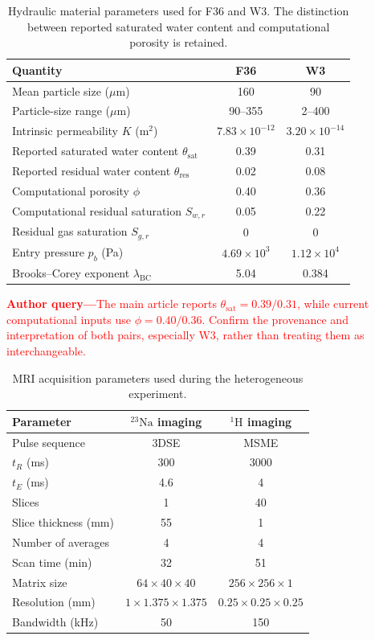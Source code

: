 \documentclass[draft,wrr]{agutexSI2019}
\newcommand{\NaIso}{\(^{23}\mathrm{Na}\)}
\newcommand{\HIso}{\(^{1}\mathrm{H}\)}
\begin{document}
\begin{table}
\caption{Hydraulic material parameters used for F36 and W3. The distinction
between reported saturated water content and computational porosity is retained.}
\label{tab:si-materials}
\centering
\begin{tabular}{p{}cc}
\toprule
Quantity & F36 & W3 \\
\midrule
Mean particle size ($\mu$m) & 160 & 90 \\
Particle-size range ($\mu$m) & 90--355 & 2--400 \\
Intrinsic permeability $K$ (m$^2$) & $7.83\times10^{-12}$ & $3.20\times10^{-14}$ \\
Reported saturated water content $\theta_{\mathrm{sat}}$ & 0.39 & 0.31 \\
Reported residual water content $\theta_{\mathrm{res}}$ & 0.02 & 0.08 \\
Computational porosity $\phi$ & 0.40 & 0.36 \\
Computational residual saturation $S_{w,r}$ & 0.05 & 0.22 \\
Residual gas saturation $S_{g,r}$ & 0 & 0 \\
Entry pressure $p_b$ (Pa) & $4.69\times10^3$ & $1.12\times10^4$ \\
Brooks--Corey exponent $\lambda_{\mathrm{BC}}$ & 5.04 & 0.384 \\
\bottomrule
\end{tabular}

\vspace{1ex}
\noindent\textcolor{red}{\textbf{Author query---}The main article reports
$\theta_{\mathrm{sat}}=0.39/0.31$, while current computational inputs use
$\phi=0.40/0.36$. Confirm the provenance and interpretation of both pairs,
especially W3, rather than treating them as interchangeable.}
\end{table}

\begin{table}
\caption{MRI acquisition parameters used during the heterogeneous experiment.}
\label{tab:si-mri}
\centering
\begin{tabular}{lcc}
\toprule
Parameter & \NaIso{} imaging & \HIso{} imaging \\
\midrule
Pulse sequence & 3DSE & MSME \\
$t_R$ (ms) & 300 & 3000 \\
$t_E$ (ms) & 4.6 & 4 \\
Slices & 1 & 40 \\
Slice thickness (mm) & 55 & 1 \\
Number of averages & 4 & 4 \\
Scan time (min) & 32 & 51 \\
Matrix size & $64\times40\times40$ & $256\times256\times1$ \\
Resolution (mm) & $1\times1.375\times1.375$ & $0.25\times0.25\times0.25$ \\
Bandwidth (kHz) & 50 & 150 \\
\bottomrule
\end{tabular}
\end{table}
\end{document}
